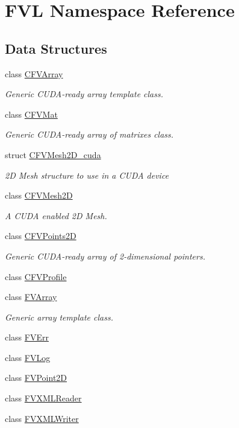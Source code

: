 \hypertarget{namespaceFVL}{
\section{FVL Namespace Reference}
\label{dd/d11/namespaceFVL}
}
\subsection*{Data Structures}
\begin{DoxyCompactItemize}
\item 
class \hyperlink{classFVL_1_1CFVArray}{CFVArray}
\begin{DoxyCompactList}\small\item\em Generic CUDA-\/ready array template class. \item\end{DoxyCompactList}\item 
class \hyperlink{classFVL_1_1CFVMat}{CFVMat}
\begin{DoxyCompactList}\small\item\em Generic CUDA-\/ready array of matrixes class. \item\end{DoxyCompactList}\item 
struct \hyperlink{structFVL_1_1CFVMesh2D__cuda}{CFVMesh2D\_\-cuda}
\begin{DoxyCompactList}\small\item\em 2D Mesh structure to use in a CUDA device \item\end{DoxyCompactList}\item 
class \hyperlink{classFVL_1_1CFVMesh2D}{CFVMesh2D}
\begin{DoxyCompactList}\small\item\em A CUDA enabled 2D Mesh. \item\end{DoxyCompactList}\item 
class \hyperlink{classFVL_1_1CFVPoints2D}{CFVPoints2D}
\begin{DoxyCompactList}\small\item\em Generic CUDA-\/ready array of 2-\/dimensional pointers. \item\end{DoxyCompactList}\item 
class \hyperlink{classFVL_1_1CFVProfile}{CFVProfile}
\item 
class \hyperlink{classFVL_1_1FVArray}{FVArray}
\begin{DoxyCompactList}\small\item\em Generic array template class. \item\end{DoxyCompactList}\item 
class \hyperlink{classFVL_1_1FVErr}{FVErr}
\item 
class \hyperlink{classFVL_1_1FVLog}{FVLog}
\item 
class \hyperlink{classFVL_1_1FVPoint2D}{FVPoint2D}
\item 
class \hyperlink{classFVL_1_1FVXMLReader}{FVXMLReader}
\item 
class \hyperlink{classFVL_1_1FVXMLWriter}{FVXMLWriter}
\end{DoxyCompactItemize}
